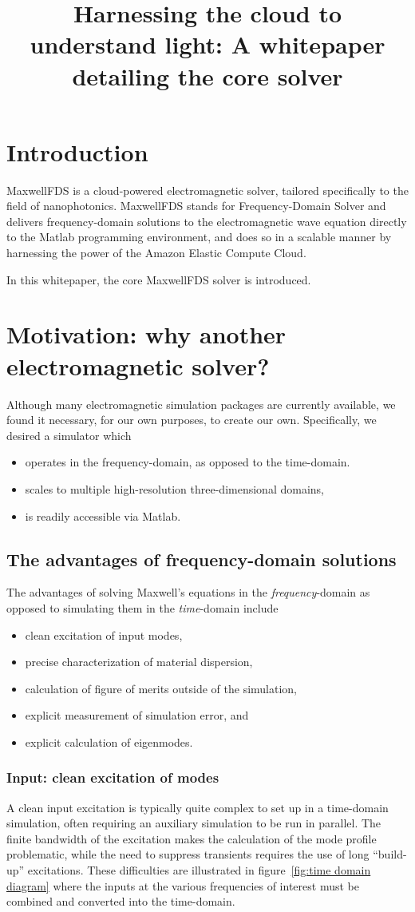 \documentclass{article}
\title{Harnessing the cloud to understand light: 
        A whitepaper detailing the \MaxwellFDS core solver}
\newcommand{\fig}[1]{figure~\ref{fig:#1}}
\newcommand{\MaxwellFDS}{MaxwellFDS }
\newcommand{\BI}{\begin{itemize}\item}
\newcommand{\EI}{\end{itemize}}
\newcommand{\I}{\item}
\begin{document}
\maketitle
\tableofcontents

\section*{Introduction}
\MaxwellFDS is a cloud-powered electromagnetic solver,
    tailored specifically to the field of nanophotonics.
\MaxwellFDS stands for Frequency-Domain Solver
    and delivers frequency-domain solutions to the electromagnetic wave equation
    directly to the Matlab programming environment,
    and does so in a scalable manner by harnessing the power
    of the Amazon Elastic Compute Cloud.

In this whitepaper, the core \MaxwellFDS solver is introduced.


\section{Motivation: why another electromagnetic solver?}
Although many electromagnetic simulation packages are currently available,
    we found it necessary, for our own purposes, to create our own.
Specifically, we desired a simulator which 
    \BI operates in the frequency-domain, as opposed to the time-domain.
    \I  scales to multiple high-resolution three-dimensional domains,
    \I  is readily accessible via Matlab. \EI

\subsection{The advantages of frequency-domain solutions}
The advantages of solving Maxwell's equations in the  \emph{frequency}-domain 
    as opposed to simulating them in the \emph{time}-domain include
    \BI clean excitation of input modes,
    \I  precise characterization of material dispersion,
    \I  calculation of figure of merits outside of the simulation,
    \I  explicit measurement of simulation error, and
    \I  explicit calculation of eigenmodes. \EI

\subsubsection{Input: clean excitation of modes}
A clean input excitation is typically quite complex to set up
    in a time-domain simulation,
    often requiring an auxiliary simulation to be run in parallel.
The finite bandwidth of the excitation makes the calculation
    of the mode profile problematic, while
    the need to suppress transients requires the use of 
    long ``build-up'' excitations.
These difficulties are illustrated in \fig{time domain diagram}
    where the inputs at the various frequencies of interest
    must be combined and converted into the time-domain.
\end{document}
